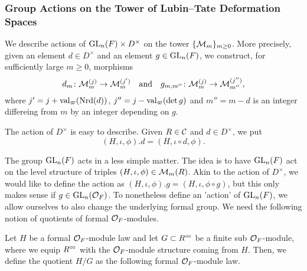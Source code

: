 \documentclass[../main.tex]{subfiles}
\begin{document}
\subsubsection{Group Actions on the Tower of Lubin--Tate Deformation Spaces} %
\label{ssub:Group Actions on the Tower of Lubin--Tate Deformation Spaces}
We describe actions of $\operatorname{GL}_n(F) \times D^\times$ on the tower
$\{\mathcal{M}_m\}_{m \geq 0}$. More precisely, given an element $d \in D^\times$ and an element
$g \in \operatorname{GL}_n(F)$, we construct, for sufficiently large $m\geq 0$, morphisms
\begin{equation*}
  d_m \colon \mathcal{M}_m^{(j)} \to \mathcal{M}_m^{(j')} \quad \text{and} \quad
  g_{m,m''} \colon \mathcal{M}_m^{(j)} \to \mathcal{M}_{m''}^{(j'')},
\end{equation*}
where $j'= j+\mathrm{val}_\varpi(\operatorname{Nrd}(d))$, $j'' = j - \mathrm{val}_\varpi(\det g)$ and $m''
= m-d$ is an integer differeing from $m$ by an integer depending on $g$. 

The action of $D^\times$ is easy to describe. Given $R \in \mathcal{C}$ and 
$d \in D^\times$, we put
\begin{equation*}
  (H, \iota, \phi).d = (H, \iota \circ d, \phi).
\end{equation*}

The group $\operatorname{GL}_n(F)$ acts in a less simple matter. The idea is to have
$\operatorname{GL}_n(F)$ act on the level structure of triples $(H, \iota, \phi) \in \mathcal{M}_m(R)$.
Akin to the action of $D^\times$, we would like to define the action as
$(H, \iota, \phi).g = (H, \iota, \phi \circ g)$, but this only makes sense
if $g \in \operatorname{GL}_n(\mathcal{O}_F)$. To nonetheless define an 'action' of $\operatorname{GL}_n(F)$, we
allow ourselves to also change the underlying formal group.
We need the following notion of quotients of formal $\mathcal{O}_F$-modules.

\begin{defi}\label{def:QuotientModule}
  Let $H$ be a formal $\mathcal{O}_F$-module law and let $G \subset R^{\circ \hspace{-0.5pt} \circ}$ be a finite
  sub $\mathcal{O}_F$-module, where we equip $R^{\circ \hspace{-0.5pt} \circ}$ with the $\mathcal{O}_F$-module structure 
  coming from $H$. Then, we define the quotient $H/G$ as the following formal
  $\mathcal{O}_F$-module law. 
\end{defi}
\end{document}
